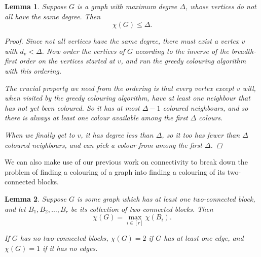 \documentclass[nobib]{tufte-handout}
\newtheorem{lemma}{Lemma}
\newtheorem{xca}{Exercise}
\begin{document}
\begin{lemma}\label{lemma:brooks_for_irregular}
  Suppose $G$ is a graph with maximum degree $\Delta$, whose vertices do not all have the same degree. Then
  $$\chi(G) \leq \Delta.$$

  \begin{proof}
    Since not all vertices have the same degree, there must exist a vertex $v$ with $d_v < \Delta$. Now order the vertices of $G$ according to the \emph{inverse} of the breadth-first order on the vertices started at $v$, and run the greedy colouring algorithm with this ordering.

    The crucial property we need from the ordering is that every vertex except $v$ will, when visited by the greedy colouring algorithm, have at least one neighbour that has not yet been coloured. So it has at most $\Delta - 1$ coloured neighbours, and so there is always at least one colour available among the first $\Delta$ colours.

    When we finally get to $v$, it has degree less than $\Delta$, so it too has fewer than $\Delta$ coloured neighbours, and can pick a colour from among the first $\Delta$.
  \end{proof}
\end{lemma}

We can also make use of our previous work on connectivity to break down the problem of finding a colouring of a graph into finding a colouring of its two-connected blocks.

\begin{lemma}\label{lemma:chi_max_over_biconnecteds}
  Suppose $G$ is some graph which has at least one two-connected block, and let $B_1, B_2, \ldots, B_r$ be its collection of two-connected blocks. Then
  $$\chi(G) = \max_{i\in[r]} \chi(B_i).$$

  If $G$ has no two-connected blocks, $\chi(G) = 2$ if $G$ has at least one edge, and $\chi(G) = 1$ if it has no edges.
\end{lemma}
\end{document}
